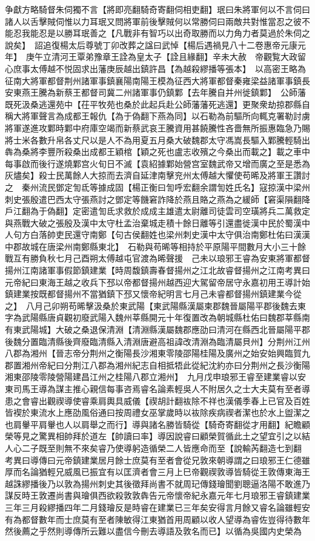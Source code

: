 争獻方略騎督朱伺獨不言【將即亮翻騎奇寄翻伺相吏翻】珉曰朱將軍何以不言伺曰諸人以舌擊賊伺惟以力耳珉又問將軍前後擊賊何以常勝伺曰兩敵共對惟當忍之彼不能忍我能忍是以勝耳珉善之【凡戰非有智巧以出奇取勝而以力角力者莫過於朱伺之說矣】　詔追復楊太后尊號丁卯改葬之諡曰武悼【楊后遇禍見八十二卷惠帝元康元年】　庚午立清河王覃弟豫章王詮為皇太子【詮且緣翻】辛未大赦　帝觀覧大政留心庶事太傅越不悦固求出藩庚辰越出鎮許昌【為越殺繆播等張本】　以高密王略為征南大將軍都督荆州諸軍事鎮襄陽南陽王模為征西大將軍都督秦雍梁益諸軍事鎮長安東燕王騰為新蔡王都督司冀二州諸軍事仍鎮鄴【去年騰自并州徙鎮鄴】　公師藩既死汲桑逃還苑中【茌平牧苑也桑於此起兵赴公師藩藩死逃還】更聚衆劫掠郡縣自稱大將軍聲言為成都王報仇【為于偽翻下燕為同】以石勒為前驅所向輒克署勒討虜將軍遂進攻鄴時鄴中府庫空竭而新蔡武哀王騰資用甚饒騰性吝嗇無所振惠臨急乃賜將士米各數升帛各丈尺以是人不為用夏五月桑大破魏郡太守馮嵩長驅入鄴騰輕騎出犇為桑將李豐所殺桑出成都王穎棺【穎之死也盧志收殯之今桑出而載之】載之車中每事啟而後行遂燒鄴宫火旬日不滅【袁紹據鄴始營宫室魏武帝又增而廣之至是悉為灰燼矣】殺士民萬餘人大掠而去濟自延津南擊兖州太傅越大懼使苟晞及將軍王讚討之　秦州流民鄧定訇氐等據成固【楊正衡曰訇呼宏翻余謂訇姓氏名】寇掠漢中梁州刺史張殷遣巴西太守張燕討之鄧定等饑窘詐降於燕且賂之燕為之緩師【窘渠隕翻降戶江翻為于偽翻】定密遣訇氐求救於成成主雄遣太尉離司徒雲司空璜將兵二萬救定與燕戰大破之張殷及漢中太守杜孟治棄城走積十餘日離等引還盡徙漢中民於蜀漢中人句方白落帥吏民還守南鄭【句古侯翻姓也梁州刺史漢中太守俱治南鄭杜佑曰漢漢中郡故城在唐梁州南鄭縣東北】　石勒與苟晞等相持於平原陽平間數月大小三十餘戰互有勝負秋七月己酉朔太傅越屯官渡為晞聲援　己未以琅邪王睿為安東將軍都督揚州江南諸軍事假節鎮建業【時周馥鎮壽春督揚州之江北故睿督揚州之江南考異曰元帝紀曰東海王越之收兵下邳以帝都督揚州越西迎大駕留帝居守永嘉初用王導計始鎮建業按既都督揚州不當猶鎮下邳又懷帝紀明言七月己未睿都督揚州鎮建業今從之】　八月己卯朔苟晞擊汲桑於東武陽【東武陽縣漢屬柬郡魏晉屬陽平郡後魏去東字為武陽縣唐貞觀初廢武陽入魏州莘縣開元十年復置改為朝城縣杜佑曰魏郡莘縣南有東武陽城】大破之桑退保清淵【清淵縣漢屬魏郡應劭曰清河在縣西北晉屬陽平郡後魏分置臨清縣後齊廢臨清縣入清淵唐避高祖諱改清淵為臨清屬貝州】分荆州江州八郡為湘州【晉志帝分荆州之衡陽長沙湘東零陵邵陽桂陽及廣州之始安始興臨賀九郡置湘州帝紀曰分荆江八郡為湘州紀志自相抵牾此從紀沈約亦曰分荆州之長沙衡陽湘東邵陵零陵營陽建昌江州之桂陽八郡立湘州】　九月戊申琅邪王睿至建業睿以安東司馬王導為謀主推心親信每事咨焉睿名論素輕吳人不附居久之士大夫莫有至者導患之會睿出觀禊導使睿乘肩輿具威儀【禊胡計翻䘠除不祥也漢儀季春上已官及百姓皆褉於東流水上應劭風俗通曰按周禮女巫掌歲時以䘠除疾病禊者潔也於水上盥潔之也肩轝平肩轝也人以肩舉之而行】導與諸名勝皆騎從【騎奇寄翻從才用翻】紀瞻顧榮等見之驚異相帥拜於道左【帥讀曰率】導因說睿曰顧榮賀循此土之望宜引之以結人心二子既至則無不來矣睿乃使導躬造循榮二人皆應命而至【說輸芮翻造七到翻　考異曰導傳曰元帝鎮建業居月餘士庶莫有至者會從兄敦來朝導謂之曰琅邪王仁德雖厚而名論猶輕兄威風已振宜有以匡濟者會三月上巳帝觀禊敦導皆騎從王敦傳東海王越誅繆播後乃以敦為揚州刺史其後徵拜尚書不就周玘傳錢璯聞劉聰逼洛陽不敢進乃謀反時王敦遷尚書與璯俱西欲殺敦敦犇告元帝懷帝紀永嘉元年七月琅邪王睿鎮建業三年三月殺繆播四年二月錢璯反是時睿在建業已三年矣安得言月餘又睿名論雖輕安有為都督數年而士庶莫有至者陳敏得江東猶首用周顧以收人望導為睿佐豈得待數年然後薦之乎然則導傳所云難以盡信今刪去導語及敦名而已】以循為吳國内史榮為